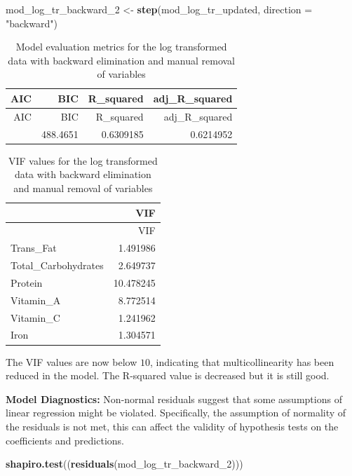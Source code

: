 \documentclass[
]{article}
\newenvironment{Shaded}{\begin{snugshade}}{\end{snugshade}}
\newcommand{\AttributeTok}[1]{\textcolor[rgb]{0.13,0.29,0.53}{#1}}
\newcommand{\FunctionTok}[1]{\textcolor[rgb]{0.13,0.29,0.53}{\textbf{#1}}}
\newcommand{\NormalTok}[1]{#1}
\newcommand{\OtherTok}[1]{\textcolor[rgb]{0.56,0.35,0.01}{#1}}
\newcommand{\StringTok}[1]{\textcolor[rgb]{0.31,0.60,0.02}{#1}}
\begin{document}
\begin{Shaded}
\begin{Highlighting}[]
\NormalTok{mod\_log\_tr\_backward\_2 }\OtherTok{\textless{}{-}} \FunctionTok{step}\NormalTok{(mod\_log\_tr\_updated, }\AttributeTok{direction =} \StringTok{"backward"}\NormalTok{)}
\end{Highlighting}
\end{Shaded}

\begin{longtable}[]{@{}rrrr@{}}
\caption{Model evaluation metrics for the log transformed data with
backward elimination and manual removal of variables}\tabularnewline
\toprule\noalign{}
AIC & BIC & R\_squared & adj\_R\_squared \\
\midrule\noalign{}
\endfirsthead
\toprule\noalign{}
AIC & BIC & R\_squared & adj\_R\_squared \\
\midrule\noalign{}
\endhead
\bottomrule\noalign{}
\endlastfoot
460.5536 & 488.4651 & 0.6309185 & 0.6214952 \\
\end{longtable}

\begin{longtable}[]{@{}lr@{}}
\caption{VIF values for the log transformed data with backward
elimination and manual removal of variables}\tabularnewline
\toprule\noalign{}
& VIF \\
\midrule\noalign{}
\endfirsthead
\toprule\noalign{}
& VIF \\
\midrule\noalign{}
\endhead
\bottomrule\noalign{}
\endlastfoot
Trans\_Fat & 1.491986 \\
Total\_Carbohydrates & 2.649737 \\
Protein & 10.478245 \\
Vitamin\_A & 8.772514 \\
Vitamin\_C & 1.241962 \\
Iron & 1.304571 \\
\end{longtable}

The VIF values are now below \(10\), indicating that multicollinearity
has been reduced in the model. The R-squared value is decreased but it
is still good.

\textbf{Model Diagnostics:} Non-normal residuals suggest that some
assumptions of linear regression might be violated. Specifically, the
assumption of normality of the residuals is not met, this can affect the
validity of hypothesis tests on the coefficients and predictions.

\begin{Shaded}
\begin{Highlighting}[]
\FunctionTok{shapiro.test}\NormalTok{((}\FunctionTok{residuals}\NormalTok{(mod\_log\_tr\_backward\_2)))}
\end{Highlighting}
\end{Shaded}
\end{document}
